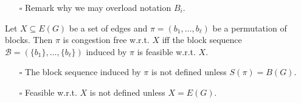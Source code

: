 \documentclass[fontsize=11pt,paper=a4]{book}
\begin{document}
\begin{itemize}
\item[{$\square$}] Remark why we may overload notation \(B_i\).
\end{itemize}

\begin{lem}
Let \(X\subseteq E(G)\) be a set of edges and \(\pi=(b_1,\dots,b_{\ell})\) be a permutation of blocks.
Then \(\pi\) is congestion free w.r.t. \(X\) iff the block sequence \(\mathcal{B}=(\{b_1\},\dots,\{b_{\ell}\})\) induced by \(\pi\) is feasible w.r.t. \(X\).
\label{org28ebda8}
\end{lem}

\begin{itemize}
\item[{$\square$}] The block sequence induced by \(\pi\) is not defined unless \(S(\pi)=B(G)\).

\item[{$\square$}] Feasible w.r.t. \(X\) is not defined unless \(X=E(G)\).
\end{itemize}
\end{document}
